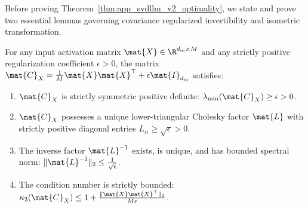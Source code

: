 Before proving Theorem~\ref{thm:app_svdllm_v2_optimality}, we state and prove two essential lemmas governing covariance regularized invertibility and isometric transformation.

\begin{lemma}
\label{lem:cov_invertibility}
For any input activation matrix $\mat{X} \in \R^{d_{\text{in}} \times M}$ and any strictly positive regularization coefficient $\epsilon > 0$, the matrix $\mat{C}_X = \frac{1}{M}\mat{X}\mat{X}^\top + \epsilon \mat{I}_{d_{\text{in}}}$ satisfies:
\begin{enumerate}
    \item $\mat{C}_X$ is strictly symmetric positive definite: $\lambda_{\min}(\mat{C}_X) \ge \epsilon > 0$.
    \item $\mat{C}_X$ possesses a unique lower-triangular Cholesky factor $\mat{L}$ with strictly positive diagonal entries $L_{ii} \ge \sqrt{\epsilon} > 0$.
    \item The inverse factor $\mat{L}^{-1}$ exists, is unique, and has bounded spectral norm: $\|\mat{L}^{-1}\|_2 \le \frac{1}{\sqrt{\epsilon}}$.
    \item The condition number is strictly bounded: $\kappa_2(\mat{C}_X) \le 1 + \frac{\|\mat{X}\mat{X}^\top\|_2}{M \epsilon}$.
\end{enumerate}
\end{lemma}

